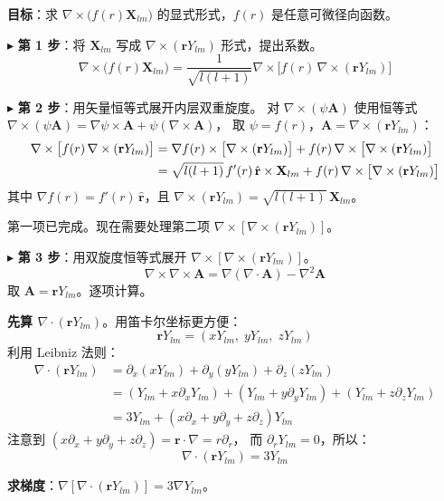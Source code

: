 \textbf{目标}：求 $\nabla\times\bigl(f(r)\mathbf{X}_{lm}\bigr)$ 的显式形式，$f(r)$ 是任意可微径向函数。

\medskip
$\blacktriangleright$ \textbf{第 1 步}：将 $\mathbf{X}_{lm}$ 写成 $\nabla\times(\mathbf{r}Y_{lm})$ 形式，提出系数。
$$
\nabla\times\bigl(f(r)\mathbf{X}_{lm}\bigr)
= \frac{1}{\sqrt{l(l+1)}}\nabla\times\bigl[f(r)\,\nabla\times(\mathbf{r}Y_{lm})\bigr]
$$

$\blacktriangleright$ \textbf{第 2 步}：用矢量恒等式展开内层双重旋度。
对 $\nabla\times(\psi\mathbf{A})$ 使用恒等式 $\nabla\times(\psi\mathbf{A}) = \nabla\psi\times\mathbf{A} + \psi(\nabla\times\mathbf{A})$，
取 $\psi = f(r)$，$\mathbf{A} = \nabla\times(\mathbf{r}Y_{lm})$：
\begin{align}
\nabla\times\bigl[f(r)\,\nabla\times(\mathbf{r}Y_{lm})\bigr]
&= \nabla f(r) \times \bigl[\nabla\times(\mathbf{r}Y_{lm})\bigr]
   + f(r)\,\nabla\times\bigl[\nabla\times(\mathbf{r}Y_{lm})\bigr] \notag\\
&= \sqrt{l(l+1)}\,f'(r)\,\hat{\mathbf{r}}\times\mathbf{X}_{lm}
   + f(r)\,\nabla\times\bigl[\nabla\times(\mathbf{r}Y_{lm})\bigr]
\end{align}
其中 $\nabla f(r) = f'(r)\,\hat{\mathbf{r}}$，且 $\nabla\times(\mathbf{r}Y_{lm}) = \sqrt{l(l+1)}\,\mathbf{X}_{lm}$。

第一项已完成。现在需要处理第二项 $\nabla\times[\nabla\times(\mathbf{r}Y_{lm})]$。

$\blacktriangleright$ \textbf{第 3 步}：用双旋度恒等式展开 $\nabla\times[\nabla\times(\mathbf{r}Y_{lm})]$。
$$
\nabla\times\nabla\times\mathbf{A} = \nabla(\nabla\cdot\mathbf{A}) - \nabla^2\mathbf{A}
$$
取 $\mathbf{A} = \mathbf{r}Y_{lm}$。逐项计算。

\textbf{先算 $\nabla\cdot(\mathbf{r}Y_{lm})$}。用笛卡尔坐标更方便：
$$
\mathbf{r}Y_{lm} = (xY_{lm},\; yY_{lm},\; zY_{lm})
$$
利用 Leibniz 法则：
\begin{align*}
\nabla\cdot(\mathbf{r}Y_{lm})
&= \partial_x(xY_{lm}) + \partial_y(yY_{lm}) + \partial_z(zY_{lm}) \\
&= (Y_{lm} + x\partial_x Y_{lm}) + (Y_{lm} + y\partial_y Y_{lm}) + (Y_{lm} + z\partial_z Y_{lm}) \\
&= 3Y_{lm} + (x\partial_x + y\partial_y + z\partial_z)Y_{lm}
\end{align*}
注意到 $(x\partial_x + y\partial_y + z\partial_z) = \mathbf{r}\cdot\nabla = r\partial_r$，
而 $\partial_r Y_{lm}=0$，所以：
$$
\boxed{\;\nabla\cdot(\mathbf{r}Y_{lm}) = 3Y_{lm}\;}
$$

\textbf{求梯度}：$\nabla[\nabla\cdot(\mathbf{r}Y_{lm})] = 3\nabla Y_{lm}$。

